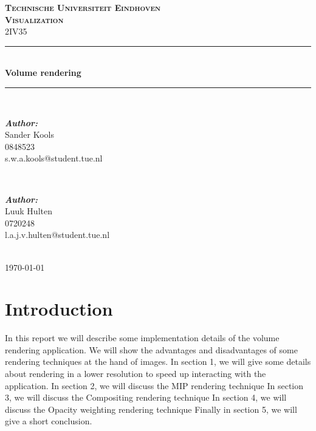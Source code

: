 \documentclass[a4paper,twoside,11pt]{article}
\newcommand{\HRule}{\rule{\linewidth}{0.5mm}} %
\begin{document}
\begin{titlepage}

\center %

\textsc{\Huge \textbf{Technische Universiteit Eindhoven}}\\[1.5cm] %
\textsc{\LARGE \textbf{Visualization}}\\[0.5cm] %
\textsc{\large 2IV35}\\[0.5cm] %

\HRule \\[0.4cm]
{ \huge \bfseries Volume rendering}\\[0.4cm] %
\HRule \\[1.5cm]

\begin{minipage}{0.4\textwidth}
\begin{flushleft} \large
\emph{\textbf{Author:}}\\
Sander Kools \\
0848523 \\
s.w.a.kools@student.tue.nl %
\end{flushleft}
\end{minipage}
~
\begin{minipage}{0.4\textwidth}
\begin{flushright} \large
\emph{\textbf{Author:}}\\
Luuk Hulten\\
0720248 \\
l.a.j.v.hulten@student.tue.nl
\end{flushright}
\end{minipage}\\[4cm]

{\large \today}\\[3cm] %

\vfill %

\end{titlepage}

\newpage
\tableofcontents
\newpage

\section*{Introduction}
In this report we will describe some implementation details of the volume rendering application. We will show the advantages and disadvantages of some rendering techniques at the hand of images.
In section 1, we will give some details about rendering in a lower resolution to speed up interacting with the application. \newline
In section 2, we will discuss the MIP rendering technique
In section 3, we will discuss the Compositing rendering technique
In section 4, we will discuss the Opacity weighting rendering technique
Finally in section 5, we will give a short conclusion. \newline
\end{document}
